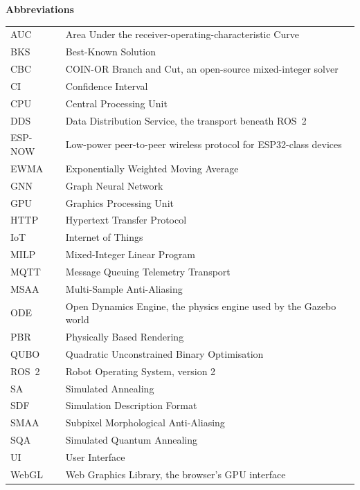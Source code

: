 {}

\begin{singlespace}
\noindent\textbf{Abbreviations}
\vspace{4pt}

\begin{longtable}{@{}p{3.0cm}p{11.2cm}@{}}
AUC & Area Under the receiver-operating-characteristic Curve \\
BKS & Best-Known Solution \\
CBC & COIN-OR Branch and Cut, an open-source mixed-integer solver \\
CI & Confidence Interval \\
CPU & Central Processing Unit \\
DDS & Data Distribution Service, the transport beneath ROS~2 \\
ESP-NOW & Low-power peer-to-peer wireless protocol for ESP32-class devices \\
EWMA & Exponentially Weighted Moving Average \\
GNN & Graph Neural Network \\
GPU & Graphics Processing Unit \\
HTTP & Hypertext Transfer Protocol \\
IoT & Internet of Things \\
MILP & Mixed-Integer Linear Program \\
MQTT & Message Queuing Telemetry Transport \\
MSAA & Multi-Sample Anti-Aliasing \\
ODE & Open Dynamics Engine, the physics engine used by the Gazebo world \\
PBR & Physically Based Rendering \\
QUBO & Quadratic Unconstrained Binary Optimisation \\
ROS~2 & Robot Operating System, version 2 \\
SA & Simulated Annealing \\
SDF & Simulation Description Format \\
SMAA & Subpixel Morphological Anti-Aliasing \\
SQA & Simulated Quantum Annealing \\
UI & User Interface \\
WebGL & Web Graphics Library, the browser's GPU interface \\
\end{longtable}


\end{singlespace}
